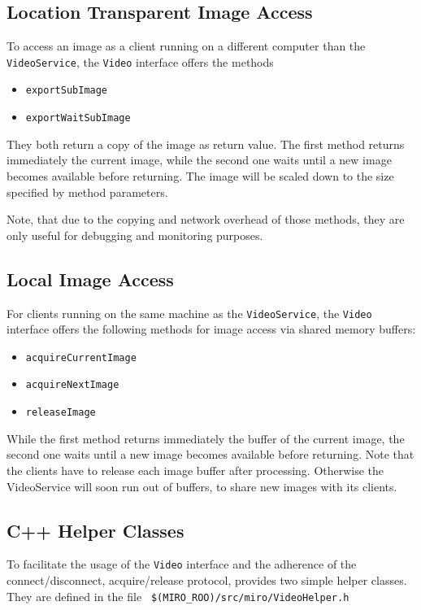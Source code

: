 \subsection{Location Transparent Image Access}

To access an image as a client running on a different computer than
the {\tt VideoService}, the {\tt Video} interface offers the methods
\begin{itemize}
\item {\tt exportSubImage}
\item {\tt exportWaitSubImage}
\end{itemize}
They both return a copy of the image as return value. The first method
returns immediately the current image, while the second one waits until
a new image becomes available before returning. The image will be
scaled down to the size specified by method parameters.

Note, that due to the copying and network overhead of those methods,
they are only useful for debugging and monitoring purposes.

\subsection{Local Image Access}

For clients running on the same machine as the {\tt VideoService}, the
{\tt Video} interface offers the following methods for image access
via shared memory buffers:
\begin{itemize}
\item {\tt acquireCurrentImage}
\item {\tt acquireNextImage}
\item {\tt releaseImage}
\end{itemize}
While the first method returns immediately the buffer of the current
image, the second one waits until a new image becomes available before
returning. Note that the clients have to release each image buffer
after processing. Otherwise the VideoService will soon run out of
buffers, to share new images with its clients.

\subsection{C++ Helper Classes}

To facilitate the usage of the {\tt Video} interface and the adherence
of the connect/disconnect, acquire/release protocol, \miro provides
two simple helper classes. They are defined in the file {\tt
  \$(MIRO\_ROO)/src/miro/VideoHelper.h}


